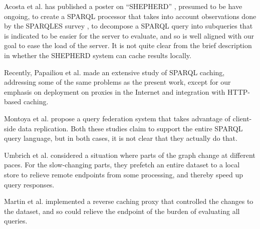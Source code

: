 Acosta et al. has published a poster on ``SHEPHERD''
\cite{acosta2014shepherd}, presumed to be have ongoing, to
create a SPARQL processor that takes into account observations done by
the SPARQLES survey \cite{buil2013sparql}, to decompose a SPARQL query into
subqueries that is indicated to be easier for the server to evaluate,
and so is well aligned with our goal to ease the load of the
server. It is not quite clear from the brief description in 
\cite{acosta2014shepherd} whether the SHEPHERD system can cache results locally.

Recently, Papailiou et al. \cite{papailiou2015graph} made an extensive
study of SPARQL caching, addressing some of the same problems as the
present work, except for our emphasis on deployment on proxies in the
Internet and integration with HTTP-based caching.  

Montoya et al. \cite{montoya2015federated} propose a query federation
system that takes advantage of client-side data replication. Both
these studies claim to support the entire SPARQL query language, but
in both cases, it is not clear that they actually do that.

Umbrich et al. \cite{umbrich2012hybrid} considered a situation where
parts of the graph change at different paces. For the slow-changing
parts, they prefetch an entire dataset to a local store to relieve
remote endpoints from some processing, and thereby speed up query
responses. 

Martin et al. \cite{sparqlproxy} implemented a reverse caching proxy
that controlled the changes to the dataset, and so could relieve the
endpoint of the burden of evaluating all queries.


